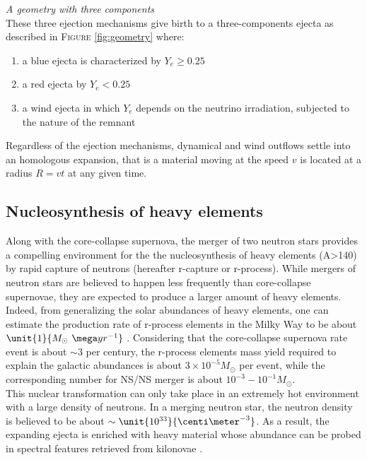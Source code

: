 \documentclass[a4paper, twoside, 11pt]{article}
\numberwithin{equation}{section}
\begin{document}
\textit{A geometry with three components} \\

These three ejection mechanisms give birth to a three-components ejecta as described in F\textsc{igure} \ref{fig:geometry} where: \begin{enumerate}[label=\roman*)]
    \item a blue ejecta is characterized by $Y_e\geq 0.25$
    \item a red ejecta by $Y_e < 0.25$
    \item a wind ejecta in which $Y_e$ depends on the neutrino irradiation, subjected to the nature of the remnant
\end{enumerate}
Regardless of the ejection mechanisms, dynamical and wind outflows settle into an homologous expansion, that is a material moving at the speed $v$ is located at a radius \(R = vt\) at any given time. 


\subsection{Nucleosynthesis of heavy elements}
\label{subsec:nucleo}
\hspace{\parindent} Along with the core-collapse supernova,  the merger of two neutron stars provides a compelling  environment for the the nucleosynthesis of heavy elements (A>140) by rapid capture of neutrons (hereafter r-capture or r-process). While mergers of neutron stars are believed to happen less frequently than core-collapse supernovae, they are expected to produce a larger amount of heavy elements. Indeed, from generalizing the solar abundances of heavy elements, one can estimate the production rate of r-process elements in the Milky Way to be about $\unit{1}{M_\odot \  \mega yr^{-1}}$ \cite{Nakar}. Considering that the core-collapse supernova rate event is about $\sim 3$ per century, the r-process elements mass yield required to explain the galactic abundances is about $\unit{3 \times10^{-5}}{M_\odot}$ per event, while the corresponding number for NS/NS merger is about $\unit{10^{-3}-10^{-1}}{M_\odot}$. \\

This nuclear transformation can only take place in an extremely hot environment with a large density of neutrons. In a merging neutron star, the neutron density is believed to be about $\sim \unit{10^{33}}{\centi\meter^{-3}}$. As a result, the expanding ejecta is enriched with heavy material whose abundance can be probed in spectral features retrieved from kilonovae \cite{ejecta}. \\
\end{document}
